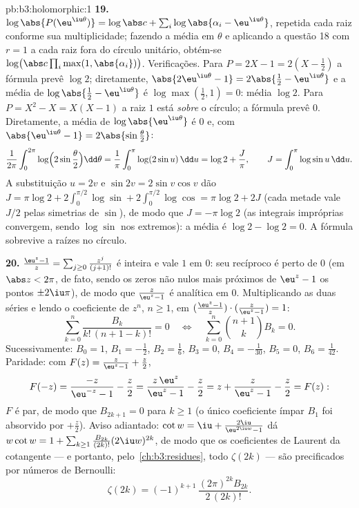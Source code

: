 \begin{solution}{pb:b3:holomorphic:1}
\textbf{19.} $\log\abs{P(\eu^{\iu\theta})} = \log\abs c +
\sum_i\log\abs{\alpha_i - \eu^{\iu\theta}}$, repetida cada raiz
conforme sua multiplicidade; fazendo a média em $\theta$ e
aplicando a questão 18 com $r = 1$ a cada raiz fora do círculo
unitário, obtém-se $\log\bigl(\abs c\prod_i\max(1,
\abs{\alpha_i})\bigr)$. Verificações. Para $P = 2X - 1 = 2(X -
\frac12)$ a fórmula prevê $\log 2$; diretamente,
$\abs{2\eu^{\iu\theta} - 1} = 2\abs{\frac12 -
\eu^{\iu\theta}}$ e a média de $\log\abs{\frac12 -
\eu^{\iu\theta}}$ é $\log\max(\frac12, 1) = 0$: média $\log
2$. Para $P = X^2 - X = X(X - 1)$ a raiz $1$ está \emph{sobre}
o círculo; a fórmula prevê $0$. Diretamente, a média de
$\log\abs{\eu^{\iu\theta}}$ é $0$ e, com
$\abs{\eu^{\iu\theta} - 1} = 2\abs{\sin\frac\theta2}$:
\[
\frac1{2\pi}\int_0^{2\pi}
\log\Bigl(2\sin\frac\theta2\Bigr)\dd\theta
= \frac1\pi\int_0^\pi\log(2\sin u)\,\dd u
= \log 2 + \frac J\pi,
\qquad J = \int_0^\pi\log\sin u\,\dd u .
\]
A substituição $u = 2v$ e $\sin 2v = 2\sin v\cos v$ dão
$J = \pi\log2 + 2\int_0^{\pi/2}\log\sin +
2\int_0^{\pi/2}\log\cos = \pi\log 2 + 2J$ (cada metade vale
$J/2$ pelas simetrias de $\sin$), de modo que $J = -\pi\log 2$ (as
integrais impróprias convergem, sendo $\log\sin$  nos
extremos): a média é $\log2 - \log2 = 0$. A fórmula
sobrevive a raízes no círculo.

\textbf{20.} $\frac{\eu^z - 1}z =
\sum_{j\geq0}\frac{z^j}{(j+1)!}$ é inteira e vale $1$ em
$0$: seu recíproco é  perto de $0$ (em $\abs z <
2\pi$, de fato, sendo os zeros não nulos mais próximos de $\eu^z - 1$ os pontos
$\pm2\iu\pi$), de modo que $\frac z{\eu^z-1}$ é analítica em $0$.
Multiplicando as duas séries e lendo o coeficiente de
$z^n$, $n \geq 1$, em $(\frac{\eu^z-1}z)\cdot(\frac
z{\eu^z-1}) = 1$:
\[
\sum_{k=0}^{n}\frac{B_k}{k!\,(n+1-k)!} = 0
\quad\Longleftrightarrow\quad
\sum_{k=0}^{n}\binom{n+1}{k}B_k = 0 .
\]
Sucessivamente: $B_0 = 1$, $B_1 = -\frac12$, $B_2 = \frac16$,
$B_3 = 0$, $B_4 = -\frac1{30}$, $B_5 = 0$, $B_6 =
\frac1{42}$. Paridade: com $F(z) = \frac z{\eu^z-1} +
\frac z2$,
\[
F(-z) = \frac{-z}{\eu^{-z} - 1} - \frac z2
= \frac{z\,\eu^z}{\eu^z - 1} - \frac z2
= z + \frac{z}{\eu^z - 1} - \frac z2 = F(z) :
\]
$F$ é par, de modo que $B_{2k+1} = 0$ para $k \geq 1$ (o único coeficiente
ímpar $B_1$ foi absorvido por $+\frac z2$). Aviso adiantado:
$\cot w = \iu + \frac{2\iu}{\eu^{2\iu w}-1}$ dá
$w\cot w = 1 + \sum_{k\geq1}\frac{B_{2k}}{(2k)!}(2\iu
w)^{2k}$, de modo que os coeficientes de Laurent da cotangente ---
e portanto, pelo~\cref{ch:b3:residues}, todo $\zeta(2k)$ --- são
precificados por números de Bernoulli:
\[
\zeta(2k) = (-1)^{k+1}\,\frac{(2\pi)^{2k}B_{2k}}{2\,(2k)!} .
\]


\end{solution}
